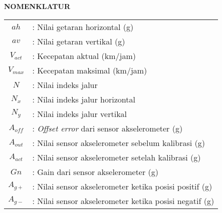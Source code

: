 \begin{center}
	\Large\textbf{NOMENKLATUR}
\end{center}
\vspace{1ex}

\begin{tabular}{c m{30em}}
	$ah$	& : Nilai getaran horizontal (g)\\
	$av$	& : Nilai getaran vertikal (g) \\
	$V_{act}$ & : Kecepatan aktual (km/jam) \\
	$V_{max}$ & : Kecepatan maksimal (km/jam) \\
	$N$ & : Nilai indeks jalur\\
	$N_{x}$ & : Nilai indeks jalur horizontal \\
	$N_{y}$ & : Nilai indeks jalur vertikal \\
	$A_{off}$ & : \textit{Offset error} dari sensor akselerometer (g) \\
	$A_{out}$ & : Nilai sensor akselerometer sebelum kalibrasi (g) \\
	$A_{act}$ & : Nilai sensor akselerometer setelah kalibrasi (g) \\
	$Gn$ & : Gain dari sensor akselerometer (g) \\
	$A_{g+}$ & : Nilai sensor akselerometer ketika posisi positif (g) \\
	$A_{g-}$ & : Nilai sensor akselerometer ketika posisi negatif (g) \\
	
\end{tabular}
\vspace{1ex}